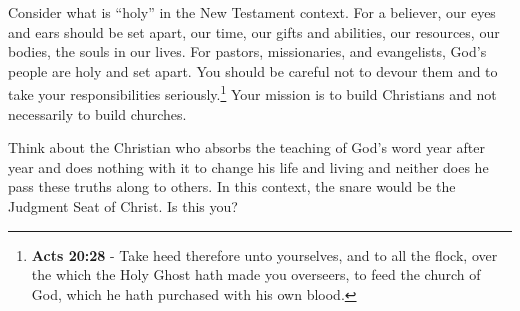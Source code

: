 Consider what is ``holy'' in the New Testament context. For a believer, our eyes and ears should be set apart, our time, our gifts and abilities, our resources, our bodies, the souls in our lives. For pastors, missionaries, and evangelists, God's people are holy and set apart. You should be careful not to devour them and to take your responsibilities seriously.\footnote{\textbf{Acts 20:28} - Take heed therefore unto yourselves, and to all the flock, over the which the Holy Ghost hath made you overseers, to feed the church of God, which he hath purchased with his own blood.} Your mission is to build Christians and not necessarily to build churches.


Think about the Christian who absorbs the teaching of God's word year after year and does nothing with it to change his life and living and neither does he pass these truths along to others.  In this context, the snare would be the Judgment Seat of Christ. Is this you?


